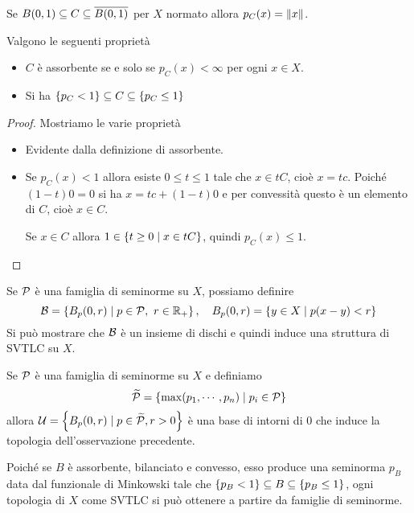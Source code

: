 \begin{remark}
Se $B(0,1)\subseteq C\subseteq \overline{B(0,1)}$ per $X$ normato allora $p_C(x)=\left\Vert{x}\right\Vert$.
\end{remark}

\begin{proposition}\label{PrProprietaFunzionaliMinkowski}
Valgono le seguenti propriet\`a
\begin{itemize}
    \item $C$ \`e assorbente se e solo se $p_C(x)<\infty$ per ogni $x\in X$.
    \item Si ha $\left\{{p_C<1}\right\}\subseteq C\subseteq\left\{{p_C\leq 1}\right\}$
\end{itemize}
\end{proposition}
\begin{proof}
Mostriamo le varie propriet\`a
\begin{itemize}
    \item Evidente dalla definizione di assorbente.
    \item Se $p_C(x)<1$ allora esiste $0\leq t\leq 1$ tale che $x\in tC$, cio\`e $x=tc$. Poich\'e $(1-t)0=0$ si ha $x=tc+(1-t)0$ e per convessit\`a questo \`e un elemento di $C$, cio\`e $x\in C$.
    
    Se $x\in C$ allora $1\in \left\{{t\geq 0\mid x\in tC}\right\}$, quindi $p_C(x)\leq 1$.
\end{itemize}
\end{proof}


\begin{remark}
    Se $\mathcal{P}$ \`e una famiglia di seminorme su $X$, possiamo definire
    \[\mathcal{B}=\left\{{B_p(0,r)\mid p\in\mathcal{P},\ r\in \mathbb{R}_+}\right\},\quad B_p(0,r)=\left\{{y\in X\mid p(x-y)<r}\right\}\]
    Si pu\`o mostrare che $\mathcal{B}$ \`e un insieme di dischi e quindi induce una struttura di SVTLC su $X$.
\end{remark}

\begin{remark}
Se $\mathcal{P}$ \`e una famiglia di seminorme su $X$ e definiamo
\[\widetilde{\mathcal{P}}=\left\{{\max (p_1,\cdots, p_n)\mid p_i\in \mathcal{P}}\right\}\]
allora $\mathcal{U}=\left\{{B_p(0,r)\mid p\in\widetilde{\mathcal{P}},r>0}\right\}$ \`e una base di intorni di $0$ che induce la topologia dell'osservazione precedente.
\end{remark}

\begin{remark}\label{RmOgniSVTLCDerivaDaSeminorme}
Poich\'e se $B$ \`e assorbente, bilanciato e convesso, esso produce una seminorma $p_B$ data dal funzionale di Minkowski tale che $\left\{{p_B<1}\right\}\subseteq B\subseteq \left\{{p_B\leq 1}\right\}$, ogni topologia di $X$ come SVTLC si pu\`o ottenere a partire da famiglie di seminorme.
\end{remark}

